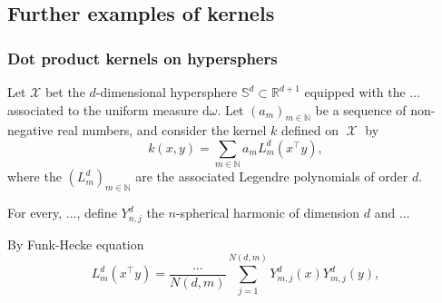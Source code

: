 \documentclass[twoside,11pt]{book}
\numberwithin{theorem}{chapter}
\numberwithin{definition}{chapter}
\numberwithin{proposition}{chapter}
\numberwithin{corollary}{chapter}
\numberwithin{example}{chapter}
\numberwithin{lemma}{chapter}
\numberwithin{assumption}{chapter}
\DeclareMathOperator{\Tran}{\intercal}
\DeclareMathOperator{\X}{\mathcal{X}}
\begin{document}
\subsection{Further examples of kernels}
\label{subsec:kernel_examples}


\subsubsection{Dot product kernels on hypersphers}

Let $\mathcal{X}$ bet the $d$-dimensional hypersphere $\mathbb{S}^{d} \subset \mathbb{R}^{d+1}$ equipped with the ... associated to the uniform measure $\mathrm{d}\omega$. Let $(a_{m})_{ m \in \mathbb{N}}$ be a sequence of non-negative real numbers, and consider the kernel $k$ defined on $\X$ by
\begin{equation}
k(x,y) = \sum\limits_{m \in \mathbb{N}} a_m L_{m}^{d}(x^{\Tran}y),
\end{equation}
where the $(L_{m}^{d})_{m \in \mathbb{N}}$ are the associated Legendre polynomials of order $d$.

For every, ..., define $Y_{n,j}^{d}$ the $n$-spherical harmonic of dimension $d$ and ...

By Funk-Hecke equation
\begin{equation}
L_{m}^{d}(x^{\Tran}y) = \frac{...}{N(d,m)} \sum\limits_{j =1}^{N(d,m)} Y_{m,j}^{d}(x)Y_{m,j}^{d}(y),
\end{equation}
\end{document}
